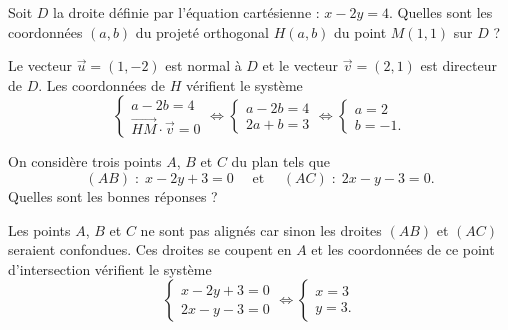 \begin{question}
Soit $D$ la droite définie par l'équation cartésienne : $x-2y=4$. Quelles sont les coordonnées $(a,b)$ du projeté orthogonal $H(a,b)$ du point $M(1,1)$ sur $D$ ?
\begin{answers}  
\end{answers}
\begin{explanations}
Le vecteur $\vec{u}=(1,-2)$ est normal à $D$ et le vecteur $\vec{v}=(2,1)$ est directeur de $D$. Les coordonnées de $H$ vérifient le système
$$\left\{\begin{array}{l}a-2b=4\\ \overrightarrow{HM}\cdot\vec{v}=0
\end{array}\right. \Leftrightarrow \left\{\begin{array}{l}a-2b=4\\ 2a+b=3
\end{array}\right. \Leftrightarrow \left\{\begin{array}{l}a=2\\ b=-1.
\end{array}\right.$$
\end{explanations}
\end{question}



\begin{question}
On considère trois points $A$, $B$ et $C$ du plan tels que
$$(AB)\; : \; x-2y+3=0\quad \mbox{ et }\quad (AC)\; : \; 2x-y-3=0.$$
Quelles sont les bonnes réponses ?
\begin{answers}  
\end{answers}
\begin{explanations}
Les points $A$, $B$ et $C$ ne sont pas alignés car sinon les droites $(AB)$ et $(AC)$ seraient confondues. Ces droites se coupent en $A$ et les coordonnées de ce point d'intersection vérifient le système 
$$\left\{\begin{array}{l}x-2y+3=0\\ 2x-y-3=0
\end{array}\right. \Leftrightarrow \left\{\begin{array}{l}x=3\\ y=3.\end{array}\right.$$
\end{explanations}
\end{question}


